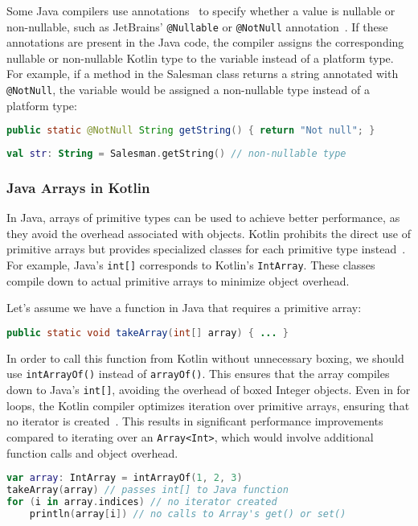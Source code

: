 \documentclass[a4paper,11pt]{article}
\begin{document}
Some Java compilers use annotations~\cite{interop-nullability-annotations} to specify whether a value is nullable or non-nullable, such as JetBrains' \texttt{@Nullable} or \texttt{@NotNull} annotation~\cite{JetBrains-annotations}. If these annotations are present in the Java code, the compiler assigns the corresponding nullable or non-nullable Kotlin type to the variable instead of a platform type. For example, if a method in the Salesman class returns a string annotated with \texttt{@NotNull}, the variable would be assigned a non-nullable type instead of a platform type:
\begin{lstlisting}[language=Java]
public static @NotNull String getString() { return "Not null"; }
\end{lstlisting}
\begin{lstlisting}[language=Kotlin]
val str: String = Salesman.getString() // non-nullable type
\end{lstlisting}

\subsubsection{Java Arrays in Kotlin}
In Java, arrays of primitive types can be used to achieve better performance, as they avoid the overhead associated with objects. Kotlin prohibits the direct use of primitive arrays but provides specialized classes for each primitive type instead~\cite{interop-arrays}. For example, Java's \texttt{int[]} corresponds to Kotlin's \texttt{IntArray}. These classes compile down to actual primitive arrays to minimize object overhead.

Let's assume we have a function in Java that requires a primitive array:
\begin{lstlisting}[language=Java]
public static void takeArray(int[] array) { ... }
\end{lstlisting}

In order to call this function from Kotlin without unnecessary boxing, we should use \texttt{intArrayOf()} instead of \texttt{arrayOf()}. This ensures that the array compiles down to Java's \texttt{int[]}, avoiding the overhead of boxed Integer objects. Even in for loops, the Kotlin compiler optimizes iteration over primitive arrays, ensuring that no iterator is created~\cite{interop-arrays}. This results in significant performance improvements compared to iterating over an \texttt{Array<Int>}, which would involve additional function calls and object overhead.

\begin{lstlisting}[language=Kotlin]
var array: IntArray = intArrayOf(1, 2, 3)
takeArray(array) // passes int[] to Java function
for (i in array.indices) // no iterator created
    println(array[i]) // no calls to Array's get() or set()
\end{lstlisting}
\end{document}
